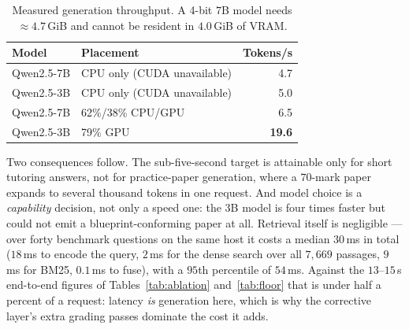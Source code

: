 \documentclass[conference]{IEEEtran}
\begin{document}
\begin{table}[htbp]
\caption{Measured generation throughput. A 4-bit $7$B model needs
$\approx 4.7$\,GiB and cannot be resident in $4.0$\,GiB of VRAM.}
\label{tab:throughput}
\centering
\small
\begin{tabular}{llr}
\toprule
\textbf{Model} & \textbf{Placement} & \textbf{Tokens/s} \\
\midrule
Qwen2.5-7B & CPU only (CUDA unavailable) & 4.7 \\
Qwen2.5-3B & CPU only (CUDA unavailable) & 5.0 \\
Qwen2.5-7B & 62\%/38\% CPU/GPU & 6.5 \\
Qwen2.5-3B & 79\% GPU & \textbf{19.6} \\
\bottomrule
\end{tabular}
\end{table}

Two consequences follow. The sub-five-second target is attainable only for short
tutoring answers, not for practice-paper generation, where a $70$-mark paper
expands to several thousand tokens in one request. And model choice is a
\emph{capability} decision, not only a speed one: the $3$B model is four times
faster but could not emit a blueprint-conforming paper at all. Retrieval itself
is negligible --- over forty benchmark questions on the same host it costs a
median $30$\,ms in total ($18$\,ms to encode the query, $2$\,ms for the dense
search over all $7{,}669$ passages, $9$\,ms for BM25, $0.1$\,ms to fuse), with a
$95$th percentile of $54$\,ms. Against the $13$--$15$\,s end-to-end figures of
Tables~\ref{tab:ablation} and~\ref{tab:floor} that is under half a percent of a
request: latency \emph{is} generation here, which is why the corrective layer's
extra grading passes dominate the cost it adds.
\end{document}
